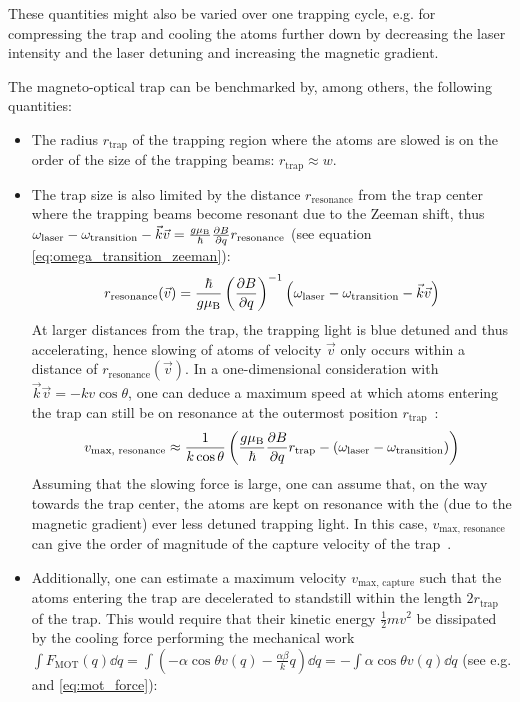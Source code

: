 These quantities might also be varied over one trapping cycle, e.g. for compressing the trap and cooling the atoms further down by decreasing the laser intensity and the laser detuning and increasing the magnetic gradient.

The magneto-optical trap can be benchmarked by, among others, the following quantities:
\begin{itemize}
    \item The radius $r_\text{trap}$ of the trapping region where the atoms are slowed  is on the order of the size of the trapping beams: $r_\text{trap} \approx w$.
    \item The trap size is also limited by the distance $r_\text{resonance}$ from the trap center where the trapping beams become resonant due to the Zeeman shift, thus $\omega_\text{laser} - \omega_\text{transition} - \vec k \vec v = \frac{g \mu_\text{B}}{\hbar} \pdv{B}{q} r_\text{resonance}$ (see equation \ref{eq:omega_transition_zeeman}):
    \begin{align}\label{eq:resonance_radius}
        r_\text{resonance}(\vec v) = \frac{\hbar}{g \mu_\text{B}} \left(\pdv{B}{q}\right)^{-1} \left(\omega_\text{laser} - \omega_\text{transition} - \vec k \vec v\right)
    \end{align}
     At larger distances from the trap, the trapping light is blue detuned and thus accelerating, hence slowing of atoms of velocity $\vec v$ only occurs within a distance of $r_\text{resonance}(\vec v)$. In a one-dimensional consideration with $\vec k \vec v = - kv \cos\theta$, one can deduce a maximum speed at which atoms entering the trap can still be on resonance at the outermost position $r_\text{trap}$~\cite{tiecke_high-flux_2009}:
    \begin{align}\label{eq:resonance_velocity}
        v_\text{max, resonance} \approx \frac{1}{k \cos \theta}
        \left(
            \frac{g \mu_\text{B}}{\hbar} \pdv{B}{q} r_\text{trap} - \left(\omega_\text{laser} - \omega_\text{transition}\right)
        \right)
    \end{align}
    Assuming that the slowing force is large, one can assume that, on the way towards the trap center, the atoms are kept on resonance with the (due to the magnetic gradient) ever less detuned trapping light. In this case, $v_\text{max, resonance}$ can give the order of magnitude of the capture velocity of the trap~\cite{tiecke_high-flux_2009}.
    \item Additionally, one can estimate a maximum velocity $v_\text{max, capture}$ such that the atoms entering the trap are decelerated to standstill within the length $2r_\text{trap}$ of the trap. This would require that their kinetic energy $\frac{1}{2}mv^2$ be dissipated by the cooling force performing the mechanical work $\int F_\text{MOT}(q) \dd{q} = \int (-\alpha \cos \theta v(q) - \frac{\alpha\beta}{k}q) \dd{q} = - \int \alpha \cos \theta v(q) \dd{q}$ (see e.g. \cite{lunden_enhancing_2020} and \eqref{eq:mot_force}):

\end{itemize}
